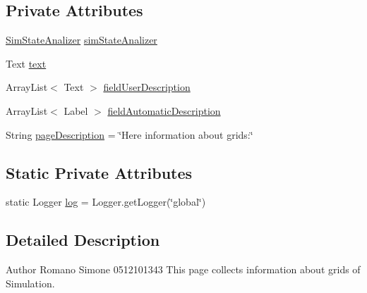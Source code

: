 \subsection*{Private Attributes}
\begin{DoxyCompactItemize}
\item 
\hyperlink{classit_1_1isislab_1_1masonassisteddocumentation_1_1mason_1_1analizer_1_1_sim_state_analizer}{Sim\-State\-Analizer} \hyperlink{classit_1_1isislab_1_1masonassisteddocumentation_1_1mason_1_1wizards_1_1_g___grids_cell_page_a7880d671931d7229eb3d46f54fcc5697}{sim\-State\-Analizer}
\item 
Text \hyperlink{classit_1_1isislab_1_1masonassisteddocumentation_1_1mason_1_1wizards_1_1_g___grids_cell_page_a04f37a0ddf6f1114dc54a0b9b6b97c03}{text}
\item 
Array\-List$<$ Text $>$ \hyperlink{classit_1_1isislab_1_1masonassisteddocumentation_1_1mason_1_1wizards_1_1_g___grids_cell_page_a577a9a3e29fcbfedf223789bed72726a}{field\-User\-Description}
\item 
Array\-List$<$ Label $>$ \hyperlink{classit_1_1isislab_1_1masonassisteddocumentation_1_1mason_1_1wizards_1_1_g___grids_cell_page_af8dd94e182682144fd2385bda6469d65}{field\-Automatic\-Description}
\item 
String \hyperlink{classit_1_1isislab_1_1masonassisteddocumentation_1_1mason_1_1wizards_1_1_g___grids_cell_page_ab1d80cb9520f55aad14d895bb329be8b}{page\-Description} = \char`\"{}Here information about grids\-:\char`\"{}
\end{DoxyCompactItemize}
\subsection*{Static Private Attributes}
\begin{DoxyCompactItemize}
\item 
static Logger \hyperlink{classit_1_1isislab_1_1masonassisteddocumentation_1_1mason_1_1wizards_1_1_g___grids_cell_page_af9381249a168e3632b695ddc0f22a4e5}{log} = Logger.\-get\-Logger(\char`\"{}global\char`\"{})
\end{DoxyCompactItemize}


\subsection{Detailed Description}
\begin{DoxyAuthor}{Author}
Romano Simone 0512101343 This page collects information about grids of Simulation. 
\end{DoxyAuthor}


